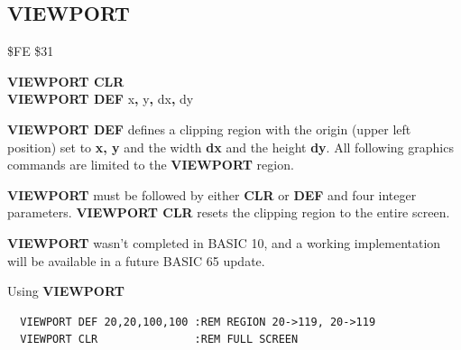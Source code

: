 \subsection{VIEWPORT}
\begin{description}[leftmargin=2cm,style=nextline]
\item [Token:] \$FE \$31
\item [Format:] {\bf VIEWPORT CLR} \\
		{\bf VIEWPORT DEF} x{\bf,} y{\bf,} dx{\bf,} dy
\item [Usage:] {\bf VIEWPORT DEF} defines a clipping region with the origin
               (upper left position) set to {\bf x, y} and the width {\bf dx}
               and the height {\bf dy}.
               All following graphics commands are limited to the {\bf VIEWPORT}
               region.

\item [Remarks:] {\bf VIEWPORT} must be followed by either {\bf CLR} or
                 {\bf DEF} and four integer parameters.
                 {\bf VIEWPORT CLR} resets the clipping region to the entire screen.

\item [Info:] {\bf VIEWPORT} wasn't completed in BASIC 10, and
              a working implementation will be available in a future BASIC 65 update.

\item [Example:] Using {\bf VIEWPORT}
\begin{tcolorbox}[colback=black,coltext=white]
\verbatimfont{\codefont}
\begin{verbatim}
  VIEWPORT DEF 20,20,100,100 :REM REGION 20->119, 20->119
  VIEWPORT CLR               :REM FULL SCREEN
\end{verbatim}
\end{tcolorbox}
\end{description}


\newpage
